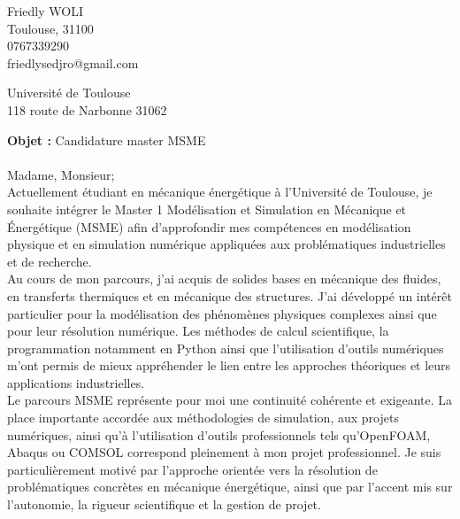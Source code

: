 \documentclass[11pt,a4paper]{article}
\begin{document}
	\pagestyle{empty}
	
	\noindent
	Friedly WOLI \\  %
	Toulouse, 31100  \\
	0767339290 \\
	friedlysedjro@gmail.com 
	
	\begin{flushright}
		
		Université de Toulouse \\
		118 route de Narbonne 31062 
	\end{flushright}
	
	
	\bigskip
	
	
	
	
	
	
	\textbf{Objet :} Candidature master MSME \\ \\
	Madame, Monsieur;\\
	
	Actuellement étudiant en mécanique énergétique à l’Université de Toulouse, je souhaite intégrer le Master 1 Modélisation et Simulation en Mécanique et Énergétique (MSME) afin d’approfondir mes compétences en modélisation physique et en simulation numérique appliquées aux problématiques industrielles et de recherche.\\
	
	Au cours de mon parcours, j’ai acquis de solides bases en mécanique des fluides, en transferts thermiques et en mécanique des structures. J’ai développé un intérêt particulier pour la modélisation des phénomènes physiques complexes ainsi que pour leur résolution numérique. Les méthodes de calcul scientifique, la programmation notamment en Python ainsi que l’utilisation d’outils numériques m’ont permis de mieux appréhender le lien entre les approches théoriques et leurs applications industrielles.\\
	
	Le parcours MSME représente pour moi une continuité cohérente et exigeante. La place importante accordée aux méthodologies de simulation, aux projets numériques, ainsi qu’à l’utilisation d’outils professionnels tels qu’OpenFOAM, Abaqus ou COMSOL correspond pleinement à mon projet professionnel. Je suis particulièrement motivé par l’approche orientée vers la résolution de problématiques concrètes en mécanique énergétique, ainsi que par l’accent mis sur l’autonomie, la rigueur scientifique et la gestion de projet.\\
	
\end{document}
